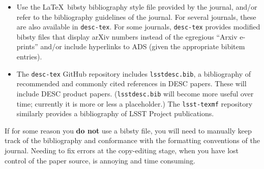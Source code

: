 \documentclass[letterpaper,11pt]{article}
\begin{document}
\begin{itemize}

\item
Use the La\TeX~bibsty bibliography style file provided by the journal, and/or refer to the bibliography guidelines of the journal.  For several journals, these are also available in {\tt desc-tex}.  For some journals,  {\tt desc-tex} provides modified bibsty files that display arXiv numbers instead of the egregious ``Arxiv e-prints'' and/or include hyperlinks to ADS (given the appropriate bibitem entries).

\item
The   {\tt desc-tex} GitHub repository includes {\tt lsstdesc.bib}, a bibliography of recommended and commonly cited references in DESC papers.  These will include DESC product papers.  ({\tt lsstdesc.bib} will become more useful over time; currently it is more or less a placeholder.) The {\tt lsst-texmf} repository similarly provides a bibliography of LSST Project publications.

\end{itemize}

If for some reason you {\bf do not} use a bibsty file, you will need to manually keep track of the bibliography and conformance with the formatting conventions of the journal.  Needing to fix errors at the copy-editing stage, when you have lost control of the paper source, is annoying and time consuming.

%
\end{document}
